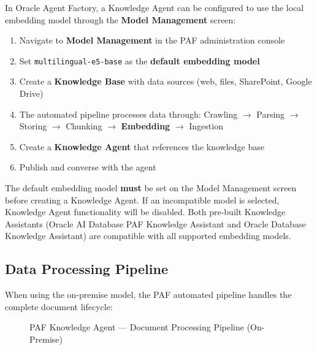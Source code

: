 \documentclass[12pt,a4paper]{article}
\begin{document}
In Oracle Agent Factory, a Knowledge Agent can be configured to use the local embedding model through the \textbf{Model Management} screen:

\begin{enumerate}[label=\textbf{Step \arabic*:}]
  \item Navigate to \textbf{Model Management} in the PAF administration console
  \item Set \texttt{multilingual-e5-base} as the \textbf{default embedding model}
  \item Create a \textbf{Knowledge Base} with data sources (web, files, SharePoint, Google Drive)
  \item The automated pipeline processes data through: Crawling $\rightarrow$ Parsing $\rightarrow$ Storing $\rightarrow$ Chunking $\rightarrow$ \textbf{Embedding} $\rightarrow$ Ingestion
  \item Create a \textbf{Knowledge Agent} that references the knowledge base
  \item Publish and converse with the agent
\end{enumerate}

\begin{infobox}
The default embedding model \textbf{must} be set on the Model Management screen before creating a Knowledge Agent. If an incompatible model is selected, Knowledge Agent functionality will be disabled. Both pre-built Knowledge Assistants (Oracle AI Database PAF Knowledge Assistant and Oracle Database Knowledge Assistant) are compatible with all supported embedding models.
\end{infobox}

\subsection{Data Processing Pipeline}

When using the on-premise model, the PAF automated pipeline handles the complete document lifecycle:

\begin{figure}[H]
\centering
{}
\caption{PAF Knowledge Agent — Document Processing Pipeline (On-Premise)}
\label{fig:pipeline}
\end{figure}
\end{document}
